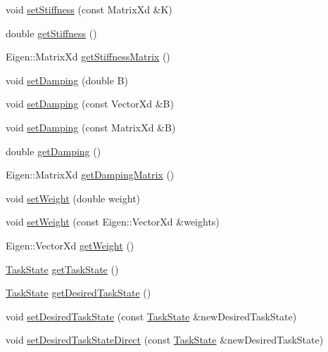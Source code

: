 \begin{DoxyCompactItemize}
\item 
void \hyperlink{classocra_1_1TaskYarpInterface_ab8b1a2c280686f67d7af869bb639e1f5}{set\+Stiffness} (const Matrix\+Xd \&K)
\item 
double \hyperlink{classocra_1_1TaskYarpInterface_ac8fe0e816f2ded6c2280ee0fef70ae54}{get\+Stiffness} ()
\item 
Eigen\+::\+Matrix\+Xd \hyperlink{classocra_1_1TaskYarpInterface_a8295f6038a0a1bde584eb0e94d3defa7}{get\+Stiffness\+Matrix} ()
\item 
void \hyperlink{classocra_1_1TaskYarpInterface_af8523d8d22368ee189c840dc96df66c4}{set\+Damping} (double B)
\item 
void \hyperlink{classocra_1_1TaskYarpInterface_a8545fbcd2c83f7b852d63750c3ec375e}{set\+Damping} (const Vector\+Xd \&B)
\item 
void \hyperlink{classocra_1_1TaskYarpInterface_ac6c7216e9c32fde4bf129956fe44fbea}{set\+Damping} (const Matrix\+Xd \&B)
\item 
double \hyperlink{classocra_1_1TaskYarpInterface_ae458959630ee96b24ce9dcfa174994bc}{get\+Damping} ()
\item 
Eigen\+::\+Matrix\+Xd \hyperlink{classocra_1_1TaskYarpInterface_afdb2df2def4dec4067bd4696489a3b36}{get\+Damping\+Matrix} ()
\item 
void \hyperlink{classocra_1_1TaskYarpInterface_aa66137afb92c94c1c261c067444b2f2d}{set\+Weight} (double weight)
\item 
void \hyperlink{classocra_1_1TaskYarpInterface_a06929d4d2480cd39dbcf0ef9f04fd849}{set\+Weight} (const Eigen\+::\+Vector\+Xd \&weights)
\item 
Eigen\+::\+Vector\+Xd \hyperlink{classocra_1_1TaskYarpInterface_a3e97841d50244fa093734e1d098caf79}{get\+Weight} ()
\item 
\hyperlink{classocra_1_1TaskState}{Task\+State} \hyperlink{classocra_1_1TaskYarpInterface_abf9665d9838a617c156012243aae047e}{get\+Task\+State} ()
\item 
\hyperlink{classocra_1_1TaskState}{Task\+State} \hyperlink{classocra_1_1TaskYarpInterface_ad41a96c26d189b6d5546f6a75a6fc4be}{get\+Desired\+Task\+State} ()
\item 
void \hyperlink{classocra_1_1TaskYarpInterface_a9b26a53ccbb968ffe2652e8a22386651}{set\+Desired\+Task\+State} (const \hyperlink{classocra_1_1TaskState}{Task\+State} \&new\+Desired\+Task\+State)
\item 
void \hyperlink{classocra_1_1TaskYarpInterface_a23efa660fd247e4ac34ff67899291ae8}{set\+Desired\+Task\+State\+Direct} (const \hyperlink{classocra_1_1TaskState}{Task\+State} \&new\+Desired\+Task\+State)

\end{DoxyCompactItemize}
